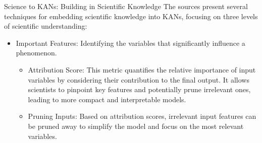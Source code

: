 Science to KANs: Building in Scientific Knowledge The sources present several
techniques for embedding scientific knowledge into KANs, focusing on three
levels of scientific understanding:
\begin{itemize}
    \item Important Features: Identifying the variables that significantly influence a
          phenomenon.
          \begin{itemize}
              \item Attribution Score: This metric quantifies the relative importance of input
                    variables by considering their contribution to the final output. It allows
                    scientists to pinpoint key features and potentially prune irrelevant ones,
                    leading to more compact and interpretable models.
              \item Pruning Inputs: Based on attribution scores, irrelevant input features can be
                    pruned away to simplify the model and focus on the most relevant variables.
          \end{itemize}


\end{itemize}
